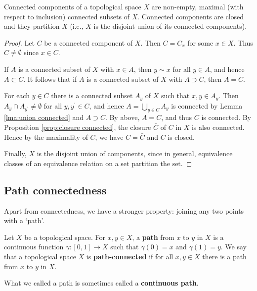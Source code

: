 \documentclass[a4paper,11pt]{article}
\begin{document}
\begin{proposition}\label{prop: connected components are maximal and partition}
    Connected components of a topological space $X$ are non-empty, maximal (with respect to inclusion) connected subsets of $X$. Connected components are closed and they partition $X$ (i.e., $X$ is the disjoint union of its connected components).
\end{proposition}
\begin{proof}
    Let $C$ be a connected component of $X$. Then $C=C_{x}$ for some $x \in X$. Thus $C \neq \emptyset$ since $x \in C$.

If $A$ is a connected subset of $X$ with $x \in A$, then $y \sim x$ for all $y \in A$, and hence $A \subset C$. It follows that if $A$ is a connected subset of $X$ with $A \supset C$, then $A=C$.

For each $y \in C$ there is a connected subset $A_{y}$ of $X$ such that $x, y \in A_{y}$. Then $A_{y} \cap A_{y^{\prime}} \neq \emptyset$ for all $y, y^{\prime} \in C$, and hence $A=\bigcup_{y \in C} A_{y}$ is connected by Lemma \ref{lma:union connected} and $A \supset C$. By above, $A=C$, and thus $C$ is connected. By Proposition \ref{prop:closure connected}, the closure $\bar{C}$ of $C$ in $X$ is also connected. Hence by the maximality of $C$, we have $C=\bar{C}$ and $C$ is closed. 

Finally, $X$ is the disjoint union of components, since in general, equivalence classes of an equivalence relation on a set partition the set.
\end{proof}

\subsection{Path connectedness}
Apart from connectedness, we have a stronger property: joining any two points with a `path'.
\begin{definition}
    Let $X$ be a topological space. For $x, y \in X$, a \textbf{path} from $x$ to $y$ in $X$ is a continuous function $\gamma:[0,1] \rightarrow X$ such that $\gamma(0)=x$ and $\gamma(1)=y$. We say that a topological space $X$ is \textbf{path-connected} if for all $x, y \in X$ there is a path from $x$ to $y$ in $X$.
\end{definition}

\begin{note}
    What we called a path is sometimes called a \textbf{continuous path}.
\end{note}
\end{document}
